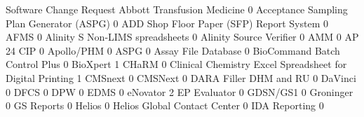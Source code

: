 \documentclass{article}
\begin{document}
\begin{Schunk}
\begin{Soutput}
                                                            Software Change Request
  Abbott Transfusion Medicine                                                     0
  Acceptance Sampling Plan Generator (ASPG)                                       0
  ADD Shop Floor Paper (SFP) Report System                                        0
  AFMS                                                                            0
  Alinity S Non-LIMS spreadsheets                                                 0
  Alinity Source Verifier                                                         0
  AMM                                                                             0
  AP 24 CIP                                                                       0
  Apollo/PHM                                                                      0
  ASPG                                                                            0
  Assay File Database                                                             0
  BioCommand Batch Control Plus                                                   0
  BioXpert                                                                        1
  CHaRM                                                                           0
  Clinical Chemistry Excel Spreadsheet for Digital Printing                       1
  CMSnext                                                                         0
  CMSNext                                                                         0
  DARA Filler DHM and RU                                                          0
  DaVinci                                                                         0
  DFCS                                                                            0
  DPW                                                                             0
  EDMS                                                                            0
  eNovator                                                                        2
  EP Evaluator                                                                    0
  GDSN/GS1                                                                        0
  Groninger                                                                       0
  GS Reports                                                                      0
  Helios                                                                          0
  Helios Global Contact Center                                                    0
  IDA Reporting                                                                   0

\end{Soutput}
\end{Schunk}
\end{document}
